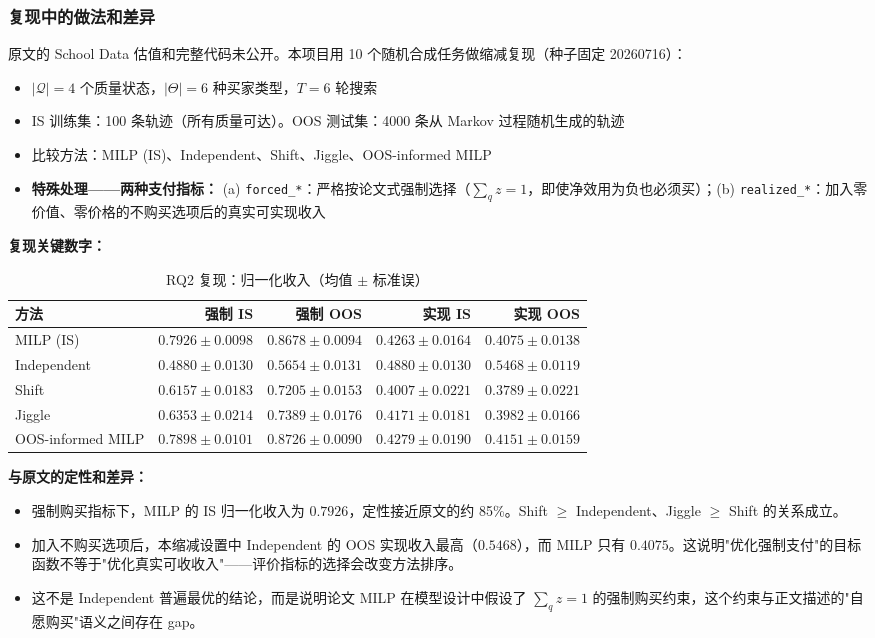 \documentclass[12pt,a4paper]{article}
\theoremstyle{definition}
\begin{document}
\subsubsection{复现中的做法和差异}

原文的 School Data 估值和完整代码未公开。本项目用 10 个随机合成任务做缩减复现（种子固定 20260716）：

\begin{itemize}[leftmargin=*]
    \item $|\mathcal{Q}|=4$ 个质量状态，$|\Theta|=6$ 种买家类型，$T=6$ 轮搜索
    \item IS 训练集：100 条轨迹（所有质量可达）。OOS 测试集：4000 条从 Markov 过程随机生成的轨迹
    \item 比较方法：MILP (IS)、Independent、Shift、Jiggle、OOS-informed MILP
    \item \textbf{特殊处理——两种支付指标：} (a) \texttt{forced\_*}：严格按论文式强制选择（$\sum_q z = 1$，即使净效用为负也必须买）；(b) \texttt{realized\_*}：加入零价值、零价格的不购买选项后的真实可实现收入
\end{itemize}

\textbf{复现关键数字：}

\begin{table}[h]
\centering
\footnotesize
\setlength{\tabcolsep}{4pt}
\caption{RQ2 复现：归一化收入（均值 $\pm$ 标准误）}
\begin{tabular}{lrrrr}
\toprule
方法 & 强制 IS & 强制 OOS & 实现 IS & 实现 OOS \\
\midrule
MILP (IS) & $0.7926\pm0.0098$ & $0.8678\pm0.0094$ & $0.4263\pm0.0164$ & $0.4075\pm0.0138$ \\
Independent & $0.4880\pm0.0130$ & $0.5654\pm0.0131$ & $0.4880\pm0.0130$ & $0.5468\pm0.0119$ \\
Shift & $0.6157\pm0.0183$ & $0.7205\pm0.0153$ & $0.4007\pm0.0221$ & $0.3789\pm0.0221$ \\
Jiggle & $0.6353\pm0.0214$ & $0.7389\pm0.0176$ & $0.4171\pm0.0181$ & $0.3982\pm0.0166$ \\
OOS-informed MILP & $0.7898\pm0.0101$ & $0.8726\pm0.0090$ & $0.4279\pm0.0190$ & $0.4151\pm0.0159$ \\
\bottomrule
\end{tabular}
\end{table}

\textbf{与原文的定性和差异：}
\begin{itemize}[leftmargin=*]
    \item 强制购买指标下，MILP 的 IS 归一化收入为 $0.7926$，定性接近原文的约 85\%。Shift $\ge$ Independent、Jiggle $\ge$ Shift 的关系成立。
    \item 加入不购买选项后，本缩减设置中 Independent 的 OOS 实现收入最高（$0.5468$），而 MILP 只有 $0.4075$。这说明"优化强制支付"的目标函数不等于"优化真实可收收入"——评价指标的选择会改变方法排序。
    \item 这不是 Independent 普遍最优的结论，而是说明论文 MILP 在模型设计中假设了 $\sum_q z = 1$ 的强制购买约束，这个约束与正文描述的"自愿购买"语义之间存在 gap。
\end{itemize}
\end{document}
